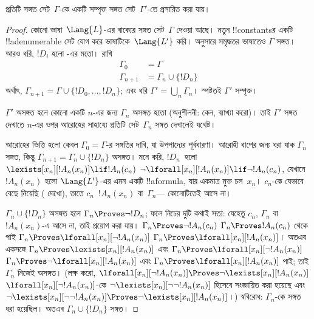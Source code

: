 \documentclass[../../../include/open-logic-section]{subfiles}
\begin{document}
\begin{lem}
প্রতিটি সঙ্গত সেট~$\Gamma$-কে একটি সম্পৃক্ত সঙ্গত সেট~$\Gamma'$-তে
প্রসারিত করা যায়।
\end{lem}

\begin{proof}
কোনো ভাষা~$\Lang{L}$-এর বাক্যের সঙ্গত সেট~$\Gamma$ দেওয়া আছে। নতুন
!!{constant}sর একটি !!a{denumerable} সেট যোগ করে ভাষাটিকে~$\Lang{L'}$
করি।  অনুসারে সমৃদ্ধতর ভাষাতেও $\Gamma$ সঙ্গত। আরও
ধরি, $!D_i$ হলো -এর মতো। রাখি
\begin{align*}
\Gamma_0 & = \Gamma \\
\Gamma_{n+1} & = \Gamma_n \cup \{!D_n \}
\end{align*}
অর্থাৎ, $\Gamma_{n+1} = \Gamma \cup \{ !D_0, \dots, !D_n \}$; এবং ধরি
$\Gamma' = \bigcup_{n} \Gamma_n$। স্পষ্টতই $\Gamma'$ সম্পৃক্ত।

$\Gamma'$ অসঙ্গত হলে কোনো একটি $n$-এর জন্য $\Gamma_n$ অসঙ্গত হতো
(অনুশীলনী: কেন, ব্যাখ্যা করো)। তাই $\Gamma'$ সঙ্গত দেখাতে $n$-এর ওপর
আরোহের সাহায্যে প্রতিটি সেট~$\Gamma_n$ সঙ্গত দেখালেই যথেষ্ট।

আরোহের ভিত্তি হলো কেবল $\Gamma_0 = \Gamma$-র সঙ্গতির দাবি, যা উপপাদ্যের
পূর্বধারণা। আরোহী ধাপের জন্য ধরা যাক $\Gamma_{n}$ সঙ্গত, কিন্তু
$\Gamma_{n+1} = \Gamma_n \cup \{!D_n\}$ অসঙ্গত। মনে করি,
$!D_n$~হলো
{$\lexists[x_{n}][!A_{n}(x_n)] \lif !A_{n}(c_{n})$}
{$\lnot\lforall[x_{n}][!A_{n}(x_n)] \lif \lnot !A_{n}(c_{n})$},
যেখানে $!A_n(x_n)$ হলো $\Lang{L'}$-এর এমন একটি !!a{formula}, যার
একমাত্র মুক্ত চল~$x_n$। $c_n$-কে যেভাবে বেছে নিয়েছি
( দেখো), তাতে $c_n$~$!A_n(x_n)$ বা~$\Gamma_n$—
কোনোটিতেই আসে না।

$\Gamma_n \cup \{!D_n\}$ অসঙ্গত হলে $\Gamma_n \Proves \lnot !D_n$;
ফলে নিচের দুটি কথাই সত্য:
যেহেতু $c_n$, $\Gamma_n$ বা~$!A_n(x_n)$-এ আসে না, তাই
প্রয়োগ করা যায়। 
{$\Gamma_n \Proves \lnot !A_n(c_n)$}
{$\Gamma_n \Proves !A_n(c_n)$}
থেকে পাই
{$\Gamma_n \Proves \lforall[x_n][\lnot !A_n(x_n)]$}
{$\Gamma_n \Proves \lforall[x_n][!A_n(x_n)]$}।
অতএব একসঙ্গে
{$\Gamma_n \Proves \lexists[x_n][!A_n(x_n)]$ এবং
$\Gamma_n \Proves \lforall[x_n][\lnot !A_n(x_n)]$}
{$\Gamma_n \Proves \lnot\lforall[x_n][!A_n(x_n)]$ এবং
$\Gamma_n \Proves \lforall[x_n][!A_n(x_n)]$}
পাই; তাই $\Gamma_n$ নিজেই অসঙ্গত।
{(লক্ষ করো,
{$\lforall[x_n][\lnot !A_n(x_n)] \Proves
  \lnot\lexists[x_n][!A_n(x_n)]$}
{$\lforall[x_n][\lnot !A_n(x_n)]$-কে
  $\lnot\lexists[x_n][\lnot\lnot !A_n(x_n)]$ হিসেবে সংজ্ঞায়িত করা হয়েছে এবং
  $\lnot\lexists[x_n][\lnot\lnot !A_n(x_n)] \Proves
  \lnot\lexists[x_n][!A_n(x_n)]$}।)}{}
স্ববিরোধ: $\Gamma_n$-কে সঙ্গত ধরা হয়েছিল। অতএব $\Gamma_n \cup \{
!D_n\}$ সঙ্গত।
\end{proof}
\end{document}

